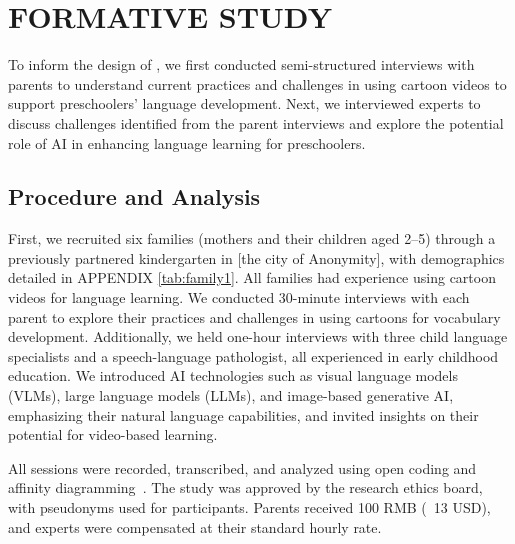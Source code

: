 \section{FORMATIVE STUDY}
To inform the design of \name{}, we first conducted semi-structured interviews with parents to understand current practices and challenges in using cartoon videos to support preschoolers' language development. 
Next, we interviewed experts to discuss challenges identified from the parent interviews and explore the potential role of AI in enhancing language learning for preschoolers.

\subsection{Procedure and Analysis}
First, we recruited six families (mothers and their children aged 2–5) through a previously partnered kindergarten in [the city of Anonymity], with demographics detailed in APPENDIX \autoref{tab:family1}.
All families had experience using cartoon videos for language learning. We conducted 30-minute interviews with each parent to explore their practices and challenges in using cartoons for vocabulary development. Additionally, we held one-hour interviews with three child language specialists and a speech-language pathologist, all experienced in early childhood education. We introduced AI technologies such as visual language models (VLMs), large language models (LLMs), and image-based generative AI, emphasizing their natural language capabilities, and invited insights on their potential for video-based learning.

All sessions were recorded, transcribed, and analyzed using open coding and affinity diagramming~\cite{braun2006using}. The study was approved by the research ethics board, with pseudonyms used for participants. Parents received 100 RMB (~13 USD), and experts were compensated at their standard hourly rate.

